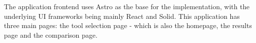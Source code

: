The application frontend uses Astro as the base for the implementation, with the underlying UI frameworks being mainly React and Solid. This application has three main pages: the tool selection page - which is also the homepage, the results page and the comparison page.
